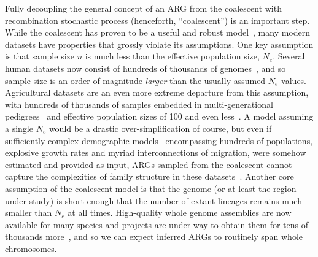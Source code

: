 \documentclass{article}
\begin{document}
Fully decoupling the general concept of an ARG from the coalescent
with recombination stochastic process (henceforth, ``coalescent'')
is an important step.
While the coalescent has proven to be a useful and
robust
model~\citep{wakeley2012gene,bhaskar2014distortion,nelson2020accounting},
many modern datasets have properties that grossly
violate its assumptions.
One key assumption is that
sample size $n$ is much less than the effective population size, $N_e$.
Several human datasets now consist of hundreds of thousands of
genomes~\citep{turnbull2018hundred, bycroft2018genome,
karczewski2020mutational,tanjo2021practical,
halldorsson2022sequences},
and so sample size is an order of magnitude \emph{larger} than the
usually assumed $N_e$ values.
Agricultural datasets are an even more extreme departure from this
assumption, with hundreds of thousands of samples embedded in
multi-generational pedigrees~\citep{hayes20191000,Ros-Freixedes2020}
and effective population sizes of 100 and even
less~\citep{MacLeod2013,Makanjuola2020,Hall2016,Porcnic2016}.
A model assuming a single $N_e$ would be a
drastic over-simplification of course, but
even if sufficiently complex demographic models~\citep{gower2022demes}
encompassing hundreds of populations, explosive growth rates and myriad
interconnections of migration, were somehow estimated and provided as input,
ARGs sampled from the coalescent cannot capture the complexities
of family structure in these
datasets~\citep[e.g.][]{turnbull2018hundred,Ros-Freixedes2020}.
Another core assumption of the coalescent model is that the genome
(or at least the region under study) is short enough that the number of extant
lineages remains much smaller than $N_e$ at all times.
High-quality whole genome assemblies are now available
for many species %
and projects are under way to obtain
them for tens of thousands more~\citep{darwin2022sequence,lewin2022earth},
and so we can expect inferred ARGs to routinely span whole chromosomes.
\end{document}
